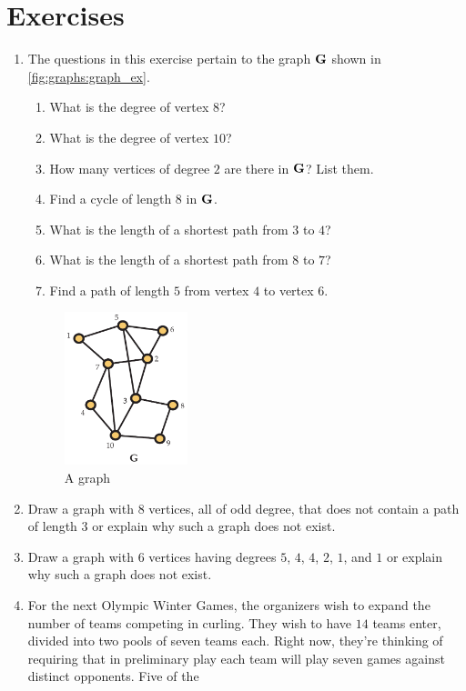 \section{Exercises}\label{s:graphs:exercises}
\begin{enumerate}
\item The questions in this exercise pertain to the graph $\mathbf{G}$ shown in
  \autoref{fig:graphs:graph_ex}.
  \begin{enumerate}
  \item What is the degree of vertex $8$?
  \item What is the degree of vertex $10$?
  \item How many vertices of degree $2$ are there in $\mathbf{G}$? List
    them.
  \item Find a cycle of length $8$ in $\mathbf{G}$.
  \item What is the length of a shortest path from $3$ to $4$?
  \item What is the length of a shortest path from $8$ to $7$?
  \item Find a path of length $5$ from vertex $4$ to vertex $6$.
  \end{enumerate}
 \begin{figure}[h]
    \centering
    \includegraphics*[height=1.75in]{graphs-figs/graph_ex}    
    \caption{A graph}
    \label{fig:graphs:graph_ex}
  \end{figure}
\item Draw a graph with $8$ vertices, all of odd degree, that does not
  contain a path of length $3$ or explain why such a graph does not
  exist.
\item Draw a graph with $6$ vertices having degrees $5$, $4$, $4$,
  $2$, $1$, and $1$ or explain why such a graph does not exist.
\item For the next Olympic Winter Games, the organizers wish to expand
  the number of teams competing in curling. They wish to have $14$
  teams enter, divided into two pools of seven teams each. Right now,
  they're thinking of requiring that in preliminary play each team
  will play seven games against distinct opponents. Five of the

\end{enumerate}

